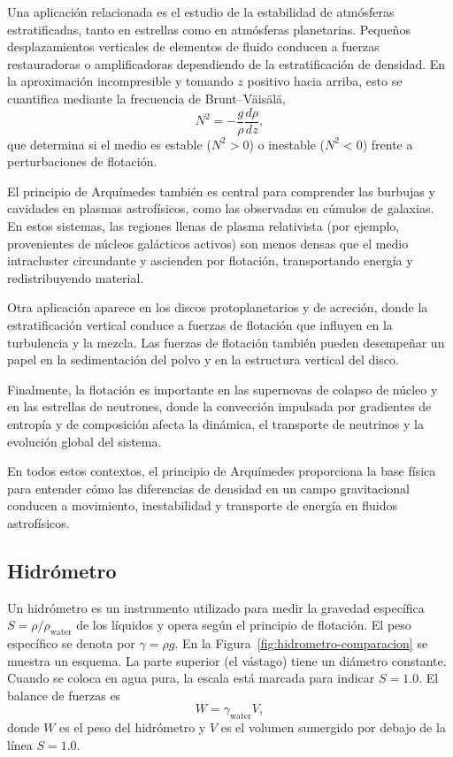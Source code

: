 Una aplicación relacionada es el estudio de la estabilidad de atmósferas estratificadas, tanto en estrellas como en atmósferas planetarias. Pequeños desplazamientos verticales de elementos de fluido conducen a fuerzas restauradoras o amplificadoras dependiendo de la estratificación de densidad. En la aproximación incompresible y tomando $z$ positivo hacia arriba, esto se cuantifica mediante la frecuencia de Brunt--Väisälä,
$$ N^2 = -\frac{g}{\rho}\frac{d\rho}{dz}, $$
que determina si el medio es estable ($N^2 > 0$) o inestable ($N^2 < 0$) frente a perturbaciones de flotación.

El principio de Arquímedes también es central para comprender las burbujas y cavidades en plasmas astrofísicos, como las observadas en cúmulos de galaxias. En estos sistemas, las regiones llenas de plasma relativista (por ejemplo, provenientes de núcleos galácticos activos) son menos densas que el medio intracluster circundante y ascienden por flotación, transportando energía y redistribuyendo material.

Otra aplicación aparece en los discos protoplanetarios y de acreción, donde la estratificación vertical conduce a fuerzas de flotación que influyen en la turbulencia y la mezcla. Las fuerzas de flotación también pueden desempeñar un papel en la sedimentación del polvo y en la estructura vertical del disco.

Finalmente, la flotación es importante en las supernovas de colapso de núcleo y en las estrellas de neutrones, donde la convección impulsada por gradientes de entropía y de composición afecta la dinámica, el transporte de neutrinos y la evolución global del sistema.

En todos estos contextos, el principio de Arquímedes proporciona la base física para entender cómo las diferencias de densidad en un campo gravitacional conducen a movimiento, inestabilidad y transporte de energía en fluidos astrofísicos.

\subsection{Hidrómetro}

Un hidrómetro es un instrumento utilizado para medir la gravedad específica $S=\rho/\rho_{\mathrm{water}}$ de los líquidos y opera según el principio de flotación. El peso específico se denota por $\gamma=\rho g$. En la Figura~\ref{fig:hidrometro-comparacion} se muestra un esquema. La parte superior (el vástago) tiene un diámetro constante. Cuando se coloca en agua pura, la escala está marcada para indicar $S=1.0$. El balance de fuerzas es
$$ W = \gamma_{\mathrm{water}} V, $$
donde $W$ es el peso del hidrómetro y $V$ es el volumen sumergido por debajo de la línea $S = 1.0$.

